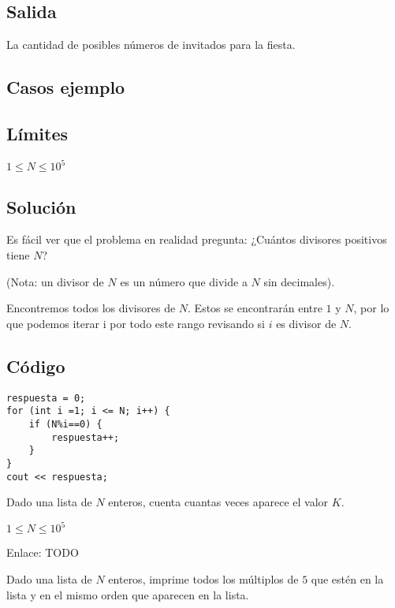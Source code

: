 \subsection*{Salida}
La cantidad de posibles números de invitados para la fiesta.
\subsection*{Casos ejemplo}
\begin{casebox2}
\end{casebox2}
\subsection*{Límites}
\begin{plimits}
	\item \(1\leq N \leq 10^5\)
\end{plimits}

\subsection*{Solución}
Es fácil ver que el problema en realidad pregunta: ¿Cuántos divisores positivos tiene \(N\)?

(Nota: un divisor de \(N\) es un número que divide a \(N\) sin decimales).

Encontremos todos los divisores de \(N\). Estos se encontrarán entre \(1\) y \(N\), por lo que podemos iterar i por todo este rango revisando si \(i\) es divisor de \(N\).
\subsection*{Código}
\begin{lstlisting}
respuesta = 0;
for (int i =1; i <= N; i++) {
	if (N%i==0) {
		respuesta++;
	}
}
cout << respuesta;
\end{lstlisting}
\newpage
{}

\problemtitle Dado una lista de \(N\) enteros, cuenta cuantas veces aparece el valor \(K\). 

\begin{plimits}
	\item \( 1\leq N\leq 10^5 \)
\end{plimits}

Enlace: TODO

\problembreak

\problemtitle Dado una lista de \(N\) enteros, imprime todos los múltiplos de \(5\) que estén en la lista y en el mismo orden que aparecen en la lista. 

